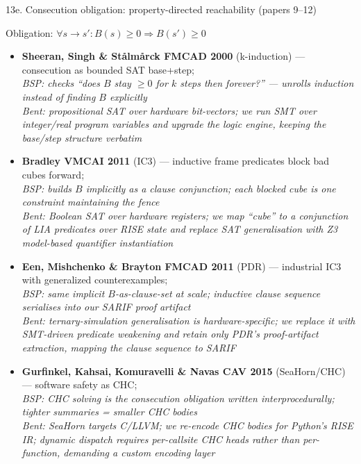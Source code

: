 \documentclass[aspectratio=169]{beamer}
\begin{document}
\begin{frame}[shrink=38]{13e. Consecution obligation: property-directed reachability (papers 9--12)}
\begin{block}{Obligation: \(\forall s\to s': B(s)\ge0 \Rightarrow B(s')\ge0\)}
\end{block}
\begin{itemize}
  \item \textbf{Sheeran, Singh \& St\aa lm\aa rck FMCAD 2000} (k-induction) --- consecution as bounded SAT base+step;\\
    \textcolor{blue!75!black}{\textit{BSP: checks ``does \(B\) stay \(\ge0\) for \(k\) steps then forever?'' --- unrolls induction instead of finding \(B\) explicitly}}\\
    \textcolor{orange!80!black}{\textit{Bent: propositional SAT over hardware bit-vectors; we run SMT over integer/real program variables and upgrade the logic engine, keeping the base/step structure verbatim}}
  \item \textbf{Bradley VMCAI 2011} (IC3) --- inductive frame predicates block bad cubes forward;\\
    \textcolor{blue!75!black}{\textit{BSP: builds \(B\) implicitly as a clause conjunction; each blocked cube is one constraint maintaining the fence}}\\
    \textcolor{orange!80!black}{\textit{Bent: Boolean SAT over hardware registers; we map ``cube'' to a conjunction of LIA predicates over RISE state and replace SAT generalisation with Z3 model-based quantifier instantiation}}
  \item \textbf{Een, Mishchenko \& Brayton FMCAD 2011} (PDR) --- industrial IC3 with generalized counterexamples;\\
    \textcolor{blue!75!black}{\textit{BSP: same implicit \(B\)-as-clause-set at scale; inductive clause sequence serialises into our SARIF proof artifact}}\\
    \textcolor{orange!80!black}{\textit{Bent: ternary-simulation generalisation is hardware-specific; we replace it with SMT-driven predicate weakening and retain only PDR's proof-artifact extraction, mapping the clause sequence to SARIF}}
  \item \textbf{Gurfinkel, Kahsai, Komuravelli \& Navas CAV 2015} (SeaHorn/CHC) --- software safety as CHC;\\
    \textcolor{blue!75!black}{\textit{BSP: CHC solving \emph{is} the consecution obligation written interprocedurally; tighter summaries = smaller CHC bodies}}\\
    \textcolor{orange!80!black}{\textit{Bent: SeaHorn targets C/LLVM; we re-encode CHC bodies for Python's RISE IR; dynamic dispatch requires per-callsite CHC heads rather than per-function, demanding a custom encoding layer}}
\end{itemize}
\end{frame}
\end{document}
